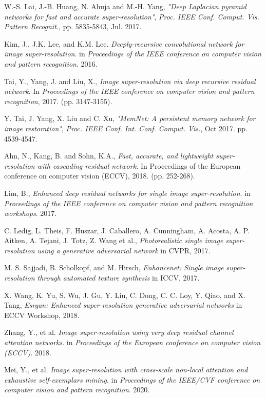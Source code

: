 \documentclass[twocolumn]{svjour3}          %
\begin{document}
\begin{thebibliography}{00}
 W.-S. Lai, J.-B. Huang, N. Ahuja and M.-H. Yang, \textit{"Deep Laplacian pyramid networks for fast and accurate super-resolution"}, \textit{Proc. IEEE Conf. Comput. Vis. Pattern Recognit.}, pp. 5835-5843, Jul. 2017.

 Kim, J., J.K. Lee, and K.M. Lee. \textit{Deeply-recursive convolutional network for image super-resolution}. in \textit{Proceedings of the IEEE conference on computer vision and pattern recognition}. 2016.

 Tai, Y., Yang, J. and Liu, X., \textit{Image super-resolution via deep recursive residual network}. In \textit{Proceedings of the IEEE conference on computer vision and pattern recognition}, 2017. (pp. 3147-3155).

 Y. Tai, J. Yang, X. Liu and C. Xu, \textit{"MemNet: A persistent memory network for image restoration"}, \textit{Proc. IEEE Conf. Int. Conf. Comput. Vis.}, Oct 2017. pp. 4539-4547. 

 Ahn, N., Kang, B. and Sohn, K.A., \textit{Fast, accurate, and lightweight super-resolution with cascading residual network.} In Proceedings of the European conference on computer vision (ECCV), 2018. (pp. 252-268).

 Lim, B., \textit{Enhanced deep residual networks for single image super-resolution}. in \textit{Proceedings of the IEEE conference on computer vision and pattern recognition workshops}. 2017.

 C. Ledig, L. Theis, F. Huszar, J. Caballero, A. Cunningham, A. Acosta, A. P. Aitken, A. Tejani, J. Totz, Z. Wang et al., \textit{Photorealistic single image super-resolution using a generative adversarial network} in CVPR, 2017.

 M. S. Sajjadi, B. Scholkopf, and M. Hirsch, \textit{Enhancenet: Single image super-resolution through automated texture synthesis} in ICCV, 2017.

 X. Wang, K. Yu, S. Wu, J. Gu, Y. Liu, C. Dong, C. C. Loy, Y. Qiao, and X. Tang, \textit{Esrgan: Enhanced super-resolution generative adversarial networks} in ECCV Workshop, 2018.

 Zhang, Y., et al. \textit{Image super-resolution using very deep residual channel attention networks}. in \textit{Proceedings of the European conference on computer vision (ECCV)}. 2018.

 Mei, Y., et al. \textit{Image super-resolution with cross-scale non-local attention and exhaustive self-exemplars mining}. in \textit{Proceedings of the IEEE/CVF conference on computer vision and pattern recognition}. 2020.


\end{thebibliography}
\end{document}

